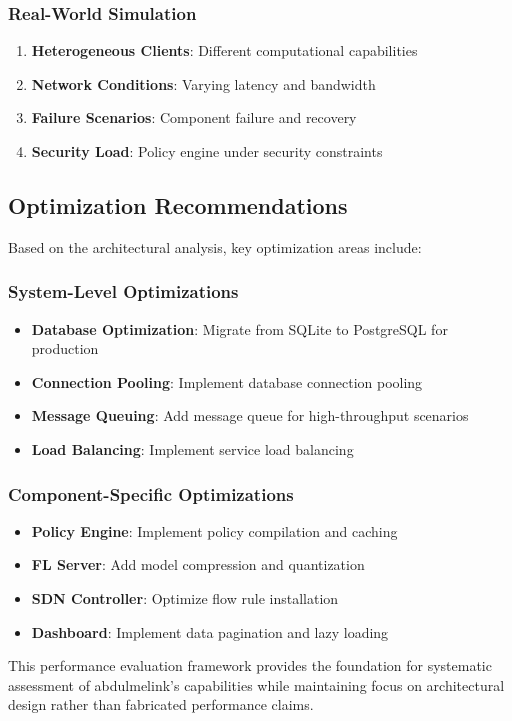 \subsubsection{Real-World Simulation}
\begin{enumerate}
    \item \textbf{Heterogeneous Clients}: Different computational capabilities
    \item \textbf{Network Conditions}: Varying latency and bandwidth
    \item \textbf{Failure Scenarios}: Component failure and recovery
    \item \textbf{Security Load}: Policy engine under security constraints
\end{enumerate}

\subsection{Optimization Recommendations}

Based on the architectural analysis, key optimization areas include:

\subsubsection{System-Level Optimizations}
\begin{itemize}
    \item \textbf{Database Optimization}: Migrate from SQLite to PostgreSQL for production
    \item \textbf{Connection Pooling}: Implement database connection pooling
    \item \textbf{Message Queuing}: Add message queue for high-throughput scenarios
    \item \textbf{Load Balancing}: Implement service load balancing
\end{itemize}

\subsubsection{Component-Specific Optimizations}
\begin{itemize}
    \item \textbf{Policy Engine}: Implement policy compilation and caching
    \item \textbf{FL Server}: Add model compression and quantization
    \item \textbf{SDN Controller}: Optimize flow rule installation
    \item \textbf{Dashboard}: Implement data pagination and lazy loading
\end{itemize}

This performance evaluation framework provides the foundation for systematic assessment of abdulmelink's capabilities while maintaining focus on architectural design rather than fabricated performance claims.
